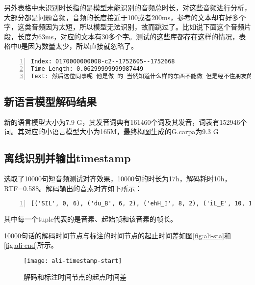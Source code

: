 另外表格中未识别时长指的是模型未能识别的音频总时长，对这些音频进行分析，大部分都是问题音频，音频的长度接近于100或者200ms，参考的文本却有好多个字，这类音频因为太短，所以模型无法识别，故而跳过了。比如说下面这个音频片段，长度为63ms，对应的文本有30多个字。测试的这些库都存在这样的情况，表格中0是因为数量太少，所以直接就忽略了。
\begin{lstlisting}[language=shell, numbers=left, 
         numberstyle=\tiny,keywordstyle=\color{blue!70},
         commentstyle=\color{red!50!green!50!blue!50},frame=shadowbox,
         rulesepcolor=\color{red!20!green!20!blue!20},basicstyle=\ttfamily]
Index: 0170000000008-c2--1752605--1752668  
Time Length: 0.06299999999987449 
Text: 然后这位同事呢 他是做 的 当然知道什么样的东西不能做 但是经不住朋友的要求
\end{lstlisting}

\subsection{新语言模型解码结果}
新的语言模型大小为7.9 G，其发音词典有161460个词及其发音，词表有152946个词。其对应的小语言模型大小为165M，最终构图生成的G.carpa为9.3 G

\subsection{离线识别并输出timestamp}
选取了10000句短音频测试对齐效果，10000句的时长为17h，解码耗时10h，RTF=0.588。解码输出的音素对齐如下所示：
\begin{lstlisting}[language=shell, numbers=left, 
         numberstyle=\tiny,keywordstyle=\color{blue!70},
         commentstyle=\color{red!50!green!50!blue!50},frame=shadowbox,
         rulesepcolor=\color{red!20!green!20!blue!20},basicstyle=\ttfamily]
[('SIL', 0, 6), ('du_B', 6, 2), ('ehH_I', 8, 2), ('iL_E', 10, 1), ('wu_B', 11, 1), ('oL_I', 12, 1), ('oL_I', 13, 1), ('m_I', 14, 1), ('elM_I', 15, 3), ('nnM_E', 18, 1), ('m_B', 19, 1), ('ehL_I', 20, 2), ('iH_I', 22, 2), ('yi_I', 24, 1), ('oL_I', 25, 1), ('uL_E', 26, 2), ('n_B', 28, 1), ('aH_I', 29, 2), ('aL_I', 31, 1), ('g_I', 32, 4), ('elM_I', 36, 1), ('elM_E', 37, 1), ('SIL', 38, 2), ('ji_B', 40, 2), ('iH_I', 42, 2), ('iH_I', 44, 1), ('ji_I', 45, 3), ('iH_I', 48, 2), ('nnH_E', 50, 4), ('SIL', 54, 9)]
\end{lstlisting}

其中每一个tuple代表的是音素、起始帧和该音素的帧长。


10000句话的解码时间节点与标注的时间节点的起止时间差如图\ref{fig:ali-sta}和\ref{fig:ali-end}所示。
\begin{figure}[!ht]
	\centering
	\texttt{[image: ali-timestamp-start]}
	\caption{解码和标注时间节点的起点时间差}
\label{fig:ali-timestamp}
\end{figure}

